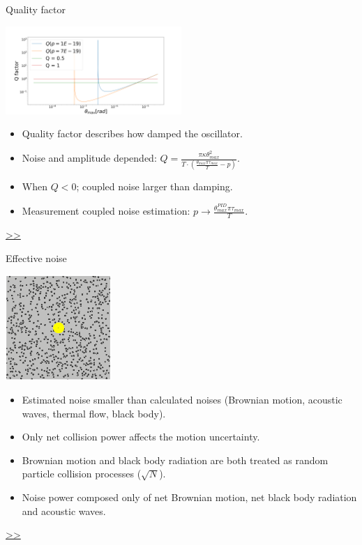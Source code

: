 \documentclass{beamer}
\begin{document}
\begin{frame}{\hypertarget{frame:Quality factor}{Quality factor}}
	\begin{center}		
		\includegraphics[width=0.5\textwidth,keepaspectratio]{Q factor.png}
	\end{center}
	\begin{itemize}	
		\item Quality factor describes how damped the oscillator.
		\item Noise and amplitude depended: $Q =  \frac{\pi\kappa\theta_{max}^2}{T\cdot(\frac{\theta_{max}\pi\tau_{max}}{T} -p)} $.
		\item When $Q<0$; coupled noise larger than damping.
		\item Measurement coupled noise estimation: $p \rightarrow \frac{ \theta_{max}^{PID}\pi\tau_{max}}{T}$. 				
	\end{itemize}
	\hyperlink{frame:Quality factor 1}{>>} 
\end{frame}

\begin{frame}{\hypertarget{frame:Effective noise}{Effective noise}}
	\begin{center}		
		\includegraphics[width=0.3\textwidth,keepaspectratio]{random_motion1.jpg}
	\end{center}


	\begin{itemize}	
		\item Estimated noise smaller than calculated noises (Brownian motion, acoustic waves, thermal flow, black body).
		\item Only net collision power affects the motion uncertainty.
		\item Brownian motion and black body radiation are both treated as random particle collision processes ($\sqrt{N}$).
		\item Noise power composed only of net Brownian motion, net black body radiation and acoustic waves.  	 
					
	\end{itemize}
	\hyperlink{frame:Effective noise 1}{>>} 

\end{frame}
\end{document}
